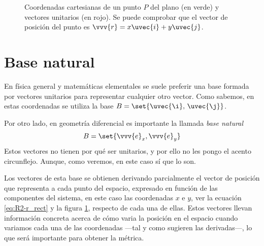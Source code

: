 \begin{figure}[ht]
  \caption{Coordenadas cartesianas de un punto $P$ del plano (en verde) y vectores
    unitarios (en rojo). Se puede comprobar que el vector de posición del punto es
    $\vvv{r} = x\uvec{i} + y\uvec{j}$.}
  \label{fig:R2-coord_rect-ij}
\end{figure}


\section{Base natural}
En física general y matemáticas elementales se suele preferir una base formada por
vectores unitarios para representar cualquier otro vector. Como sabemos, en estas
coordenadas se utiliza la base $B = \set{\uvec{\i},\,\uvec{\j}}$.

Por otro lado, en geometría diferencial es importante la llamada \emph{base natural}
\begin{equation}
  B = \set{\vvv{e}_x, \vvv{e}_y}
\end{equation}
Estos vectores no tienen por qué ser unitarios, y por ello no les pongo el acento
circunflejo. Aunque, como veremos, en este caso sí que lo son.

Los vectores de esta base se obtienen derivando parcialmente el vector de posición que
representa a cada punto del espacio, expresado en función de las componentes del
sistema, en este caso las coordenadas $x$ e $y$, ver la ecuación \eqref{eq:R2-r_rect} y
la figura \ref{fig:R2-coord_rect-ij}, respecto de cada una de ellas. Estos vectores
llevan información concreta acerca de cómo varia la posición en el espacio cuando
variamos cada una de las coordenadas ---tal y como sugieren las derivadas---, lo que
será importante para obtener la métrica.

